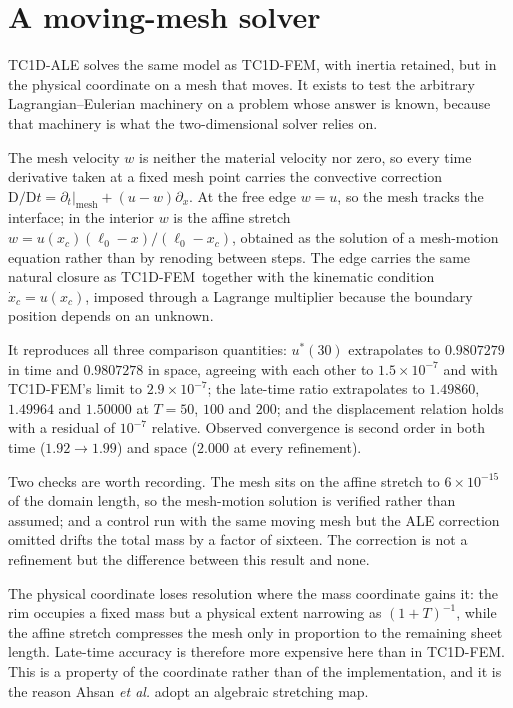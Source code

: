 \documentclass[11pt,a4paper]{article}
\newcommand{\TC}{\textsf{TC1D-FEM}}
\begin{document}
\section{A moving-mesh solver}
\label{sec:ale}

\textsf{TC1D-ALE} solves the same model as \TC, with inertia retained, but in
the physical coordinate on a mesh that moves. It exists to test the
arbitrary Lagrangian--Eulerian machinery on a problem whose answer is known,
because that machinery is what the two-dimensional solver relies on.

The mesh velocity $w$ is neither the material velocity nor zero, so every time
derivative taken at a fixed mesh point carries the convective correction
$\mathrm{D}/\mathrm{D}t = \partial_t|_{\mathrm{mesh}} + (u-w)\partial_x$. At the
free edge $w = u$, so the mesh tracks the interface; in the interior $w$ is the
affine stretch $w = u(x_c)(\ell_0 - x)/(\ell_0 - x_c)$, obtained as the solution
of a mesh-motion equation rather than by renoding between steps. The edge
carries the same natural closure as \TC\ together with the kinematic condition
$\dot{x}_c = u(x_c)$, imposed through a Lagrange multiplier because the boundary
position depends on an unknown.

It reproduces all three comparison quantities: $u^{*}(30)$ extrapolates to
$0.9807279$ in time and $0.9807278$ in space, agreeing with each other to
$1.5\times10^{-7}$ and with \TC's limit to $2.9\times10^{-7}$; the late-time
ratio extrapolates to $1.49860$, $1.49964$ and $1.50000$ at $T = 50$, $100$ and
$200$; and the displacement relation holds with a residual of $10^{-7}$
relative. Observed convergence is second order in both time ($1.92 \to 1.99$)
and space ($2.000$ at every refinement).

Two checks are worth recording. The mesh sits on the affine stretch to
$6\times10^{-15}$ of the domain length, so the mesh-motion solution is verified
rather than assumed; and a control run with the same moving mesh but the ALE
correction omitted drifts the total mass by a factor of sixteen. The correction
is not a refinement but the difference between this result and none.

The physical coordinate loses resolution where the mass coordinate gains it: the
rim occupies a fixed mass but a physical extent narrowing as $(1+T)^{-1}$, while
the affine stretch compresses the mesh only in proportion to the remaining sheet
length. Late-time accuracy is therefore more expensive here than in \TC. This is
a property of the coordinate rather than of the implementation, and it is the
reason Ahsan \textit{et al.} \cite{ahsan2025} adopt an algebraic stretching map.
\end{document}
